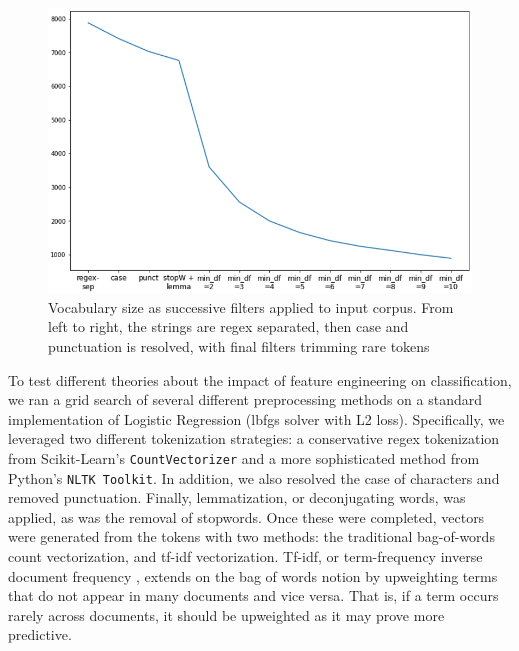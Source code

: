 \documentclass[11pt,a4paper]{article}
\begin{document}
\begin{figure}[htpb]
  \centering
  \includegraphics[width=1\linewidth]{imgs/token_filter.png}
  \caption{Vocabulary size as successive filters applied to input corpus. 
    From left to right, the strings are regex separated, then case and
  punctuation is resolved, with final filters trimming rare tokens}
  \label{fig:imgs/token_filter}
  \vspace{-10pt}
\end{figure}

To test different theories about the impact of feature engineering on classification, we ran a grid search of several different preprocessing methods on a standard implementation of Logistic Regression (lbfgs solver with L2 loss). Specifically, we leveraged two different tokenization strategies: a conservative regex tokenization from Scikit-Learn's \texttt{CountVectorizer} and a more sophisticated method from Python's \texttt{NLTK Toolkit}. In addition, we also resolved the case of characters and removed punctuation. Finally, lemmatization, or deconjugating words, was applied, as was the removal of stopwords. Once these were completed, vectors were generated from the tokens with two methods: the traditional bag-of-words \cite {luhn1957statistical} count vectorization, and tf-idf vectorization. Tf-idf, or term-frequency inverse document frequency \cite{jones1972statistical}, extends on the bag of words notion by upweighting terms that do not appear in many documents and vice versa. That is, if a term occurs rarely across documents, it should be upweighted as it may prove more predictive.
\end{document}
